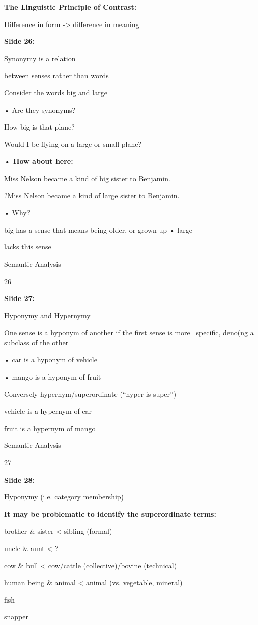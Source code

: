 \documentclass[11pt,a4paper]{article}
\begin{document}
\textbf{The Linguistic Principle of Contrast:} 

Difference in form -> difference in meaning

\textbf{Slide 26:}

Synonymy is a relation

between senses rather than words

Consider the words big and large

•  Are they synonyms?

How big is that plane?

Would I be flying on a large or small plane?

\textbf{•	How about here:} 

Miss Nelson became a kind of big sister to Benjamin.

?Miss Nelson became a kind of large sister to Benjamin.

• Why?

big has a sense that means being older, or grown up • large

lacks this sense

Semantic Analysis

26

\textbf{Slide 27:}

Hyponymy and Hypernymy

One sense is a hyponym of another if the first sense is more  specific, deno(ng a subclass of the other

• car is a hyponym of vehicle

• mango is a hyponym of fruit

Conversely hypernym/superordinate (“hyper is super”)

vehicle is a hypernym of car

fruit is a hypernym of mango

Semantic Analysis

27

\textbf{Slide 28:}

Hyponymy (i.e. category membership)

\textbf{It may be problematic to identify the superordinate terms:} 

brother & sister < sibling (formal)

uncle & aunt < ?

cow & bull < cow/cattle (collective)/bovine (technical)

human being & animal < animal (vs. vegetable, mineral)

fish

snapper
\end{document}
